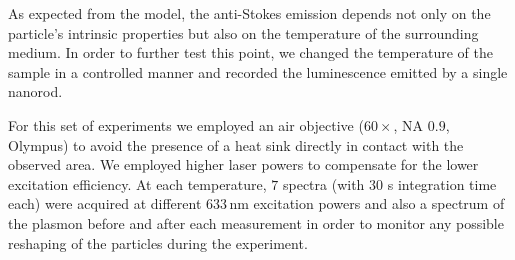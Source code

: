 \documentclass[journal=nalefd,manuscript=letter]{achemso}
\newcommand{\HI}[1]{{#1}} %
\newcommand{\nm}{\ensuremath{\,\textrm{nm}}}
\begin{document}

As expected from the model, the anti-Stokes emission depends not only on
the particle's intrinsic properties but also on the temperature of the
surrounding medium\cite{Konrad2013}. In order to \HI{further} test this point, we changed the
temperature of the sample in a controlled manner and recorded the luminescence
emitted by a single nanorod.

For this set of experiments we employed an air objective ($60\times$, NA $0.9$,
Olympus) to avoid the presence of a heat sink directly in contact with the
observed area. We employed higher laser powers to compensate for the lower
excitation efficiency. At each temperature, \HI{$7$ spectra (with $30$ s 
integration time each)} were acquired at different
$633\nm$ excitation powers and also a spectrum of the plasmon before and after
each measurement in order to monitor any possible reshaping of the particles
during the experiment.
\end{document}
